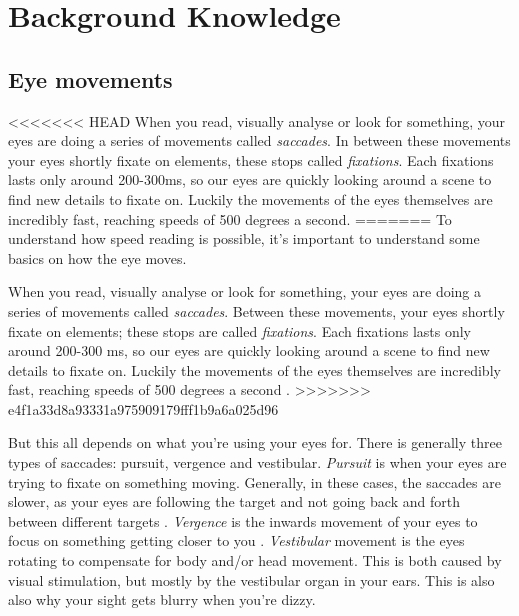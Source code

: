 \section{Background Knowledge}

\subsection{Eye movements}
<<<<<<< HEAD
When you read, visually analyse or look for something, your eyes are doing a series of movements called \textit{saccades}. In between these movements your eyes shortly fixate on elements, these stops called \textit{fixations}. Each fixations lasts only around 200-300ms, so our eyes are quickly looking around a scene to find new details to fixate on. Luckily the movements of the eyes themselves are incredibly fast, reaching speeds of 500 degrees a second.
=======
To understand how speed reading is possible, it's important to understand some basics on how the eye moves.

When you read, visually analyse or look for something, your eyes are doing a series of movements called \textit{saccades}. Between these movements, your eyes shortly fixate on elements; these stops are called \textit{fixations}. Each fixations lasts only around 200-300 ms, so our eyes are quickly looking around a scene to find new details to fixate on. Luckily the movements of the eyes themselves are incredibly fast, reaching speeds of 500 degrees a second \cite{MATHIAS KILDE}.
>>>>>>> e4f1a33d8a93331a975909179fff1b9a6a025d96

But this all depends on what you're using your eyes for. There is generally three types of saccades: pursuit, vergence and vestibular. \textit{Pursuit} is when your eyes are trying to fixate on something moving. Generally, in these cases, the saccades are slower, as your eyes are following the target and not going back and forth between different targets \cite{KILDE MATHIAS}.
\textit{Vergence} is the inwards movement of your eyes to focus on something getting closer to you \cite{KILDE MATHIAS}.
\textit{Vestibular} movement is the eyes rotating to compensate for body and/or head movement. This is both caused by visual stimulation, but mostly by the vestibular organ in your ears. This is also also why your sight gets blurry when you're dizzy.


